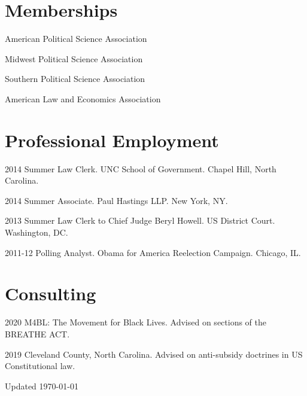 \documentclass[12pt,letterpaper]{report}
\newcommand{\listitemspace}{0.25em}
\renewenvironment{itemize}
{\begin{list}{}{\setlength{\leftmargin}{0em}
                \setlength{\parskip}{0em}
                \setlength{\itemsep}{\listitemspace}
                \setlength{\parsep}{\listitemspace}}}
{\end{list}}
\begin{document}
    

    
    
    \section*{Memberships}
    
    \begin{itemize}
    \item American Political Science Association
    \item Midwest Political Science Association
    \item Southern Political Science Association
    \item American Law and Economics Association    
    \end{itemize}
    
    \section*{Professional Employment}

    \begin{tablist}
    \item[2014] \tab{}Summer Law Clerk. UNC School of Government. Chapel Hill, North Carolina.
    \item[2014] \tab{}Summer Associate. Paul Hastings LLP. New York, NY.
    \item[2013] \tab{}Summer Law Clerk to Chief Judge Beryl Howell. US District Court. Washington, DC. 
    \item[2011-12] \tab{}Polling Analyst. Obama for America Reelection Campaign. Chicago, IL.
    \end{tablist}
    
    \section*{Consulting}
    \begin{tablist}
    \item[2020] \tab{}M4BL: The Movement for Black Lives. Advised on sections of the BREATHE ACT.
    \item[2019] \tab{}Cleveland County, North Carolina. Advised on anti-subsidy doctrines in US Constitutional law.
    \end{tablist}


    \begin{center}
        \vfill
        Updated \monthyeardate\today
    \end{center}
\end{document}
